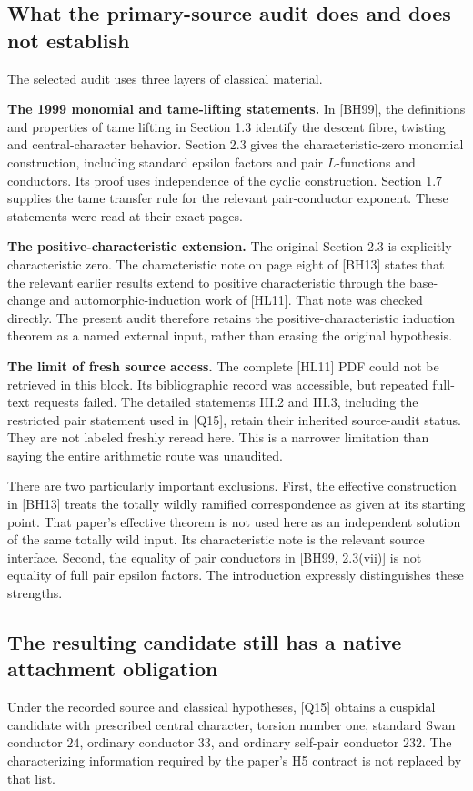 \subsection{What the primary-source audit does and does not establish}
The selected audit uses three layers of classical material.

\textbf{The 1999 monomial and tame-lifting statements.} In [BH99], the definitions and properties of tame lifting in Section 1.3 identify the descent fibre, twisting and central-character behavior. Section 2.3 gives the characteristic-zero monomial construction, including standard epsilon factors and pair $L$-functions and conductors. Its proof uses independence of the cyclic construction. Section 1.7 supplies the tame transfer rule for the relevant pair-conductor exponent. These statements were read at their exact pages.

\textbf{The positive-characteristic extension.} The original Section 2.3 is explicitly characteristic zero. The characteristic note on page eight of [BH13] states that the relevant earlier results extend to positive characteristic through the base-change and automorphic-induction work of [HL11]. That note was checked directly. The present audit therefore retains the positive-characteristic induction theorem as a named external input, rather than erasing the original hypothesis.

\textbf{The limit of fresh source access.} The complete [HL11] PDF could not be retrieved in this block. Its bibliographic record was accessible, but repeated full-text requests failed. The detailed statements III.2 and III.3, including the restricted pair statement used in [Q15], retain their inherited source-audit status. They are not labeled freshly reread here. This is a narrower limitation than saying the entire arithmetic route was unaudited.

There are two particularly important exclusions. First, the effective construction in [BH13] treats the totally wildly ramified correspondence as given at its starting point. That paper's effective theorem is not used here as an independent solution of the same totally wild input. Its characteristic note is the relevant source interface. Second, the equality of pair conductors in [BH99, 2.3(vii)] is not equality of full pair epsilon factors. The introduction expressly distinguishes these strengths.

\subsection{The resulting candidate still has a native attachment obligation}
Under the recorded source and classical hypotheses, [Q15] obtains a cuspidal candidate with prescribed central character, torsion number one, standard Swan conductor $24$, ordinary conductor $33$, and ordinary self-pair conductor $232$. The characterizing information required by the paper's H5 contract is not replaced by that list.

